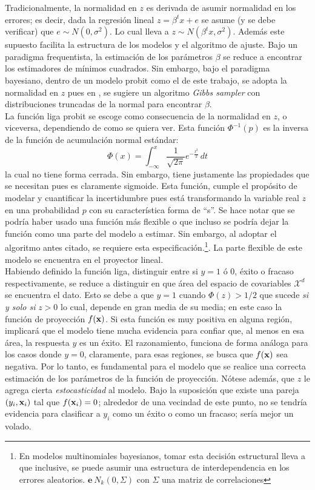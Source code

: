 \documentclass[../Main/Main.tex]{subfiles}
\begin{document}
Tradicionalmente, la normalidad en $z$ es derivada de asumir normalidad en los errores; es decir, dada la regresión lineal $z = \beta^tx + e$ se asume (y se debe verificar) que $e \sim N(0,\sigma^2)$. Lo cual lleva a $z \sim N(\beta^tx,\sigma^2)$. Además este supuesto facilita la estructura de los modelos y el algoritmo de ajuste. Bajo un paradigma frequentista, la estimación de los parámetros $\beta$ se reduce a encontrar los estimadores de mínimos cuadrados. Sin embargo, bajo el paradigma bayesiano, dentro de un modelo probit como el de este trabajo, se adopta la normalidad en $z$ pues en  \autocite{albert1993bayesian}, se sugiere un algoritmo \textit{Gibbs sampler} con distribuciones truncadas de la normal para encontrar $\beta$.\\

La función liga probit se escoge como consecuencia de la normalidad en $z$, o viceversa, dependiendo de como se quiera ver. Esta función $\Phi^{-1}(p)$ es la inversa de la función de acumulación normal estándar:
$$\Phi(x) = \int_{-\infty}^x \dfrac{1}{\sqrt{2\pi}}e^{-\frac{t^2}{2}}\, dt$$
la cual no tiene forma cerrada. Sin embargo, tiene justamente las propiedades que se necesitan pues es claramente sigmoide. Esta función, cumple el propósito de modelar y cuantificar la incertidumbre pues está transformando la variable real $z$ en una probabilidad $p$ con su característica forma de ``s''. Se hace notar que se podría haber usado una función más flexible o que incluso se podría dejar la función como una parte del modelo a estimar. Sin embargo, al adoptar el algoritmo antes citado, se requiere esta especificación.\footnote{En modelos multinomiales bayesianos, tomar esta decisión estructural lleva a que inclusive, se puede asumir una estructura de interdependencia en los errores aleatorios. $\mathbf{e} ~ N_k(0, \Sigma)$ con $\Sigma$ una matriz de correlaciones}. La parte flexible de este modelo se encuentra en el proyector lineal. \\

Habiendo definido la función liga, distinguir entre si $y = 1$ ó 0, éxito o fracaso respectivamente, se reduce a distinguir en que área del espacio de covariables $\mathcal{X}^d$ se encuentra el dato. Esto se debe a que $y = 1$ cuando $\Phi(z) > 1/2$ que sucede \textit{si y solo si} $z>0$ lo cual, depende en gran media de su media; en este caso la función de proyección $f(\mathbf{x})$. Si esta función es muy positiva en alguna región, implicará que el modelo tiene mucha evidencia para confiar que, al menos en esa área, la respuesta $y$ es un éxito. El razonamiento, funciona de forma análoga para los casos donde $y = 0$, claramente, para esas regiones, se busca que $f(\mathbf{x})$ sea negativa. Por lo tanto, es fundamental para el modelo que se realice una correcta estimación de los parámetros de la función de proyección.  Nótese además, que $z$ le agrega cierta \textit{estocasticidad} al modelo. Bajo la suposición que existe una pareja $(y_i,\mathbf{x}_i)$ tal que $f(\mathbf{x}_i) = 0$; alrededor de una vecindad de este punto, no se tendría evidencia para clasificar a $y_i$ como un éxito o como un fracaso; sería mejor un volado.\\ 
\end{document}
